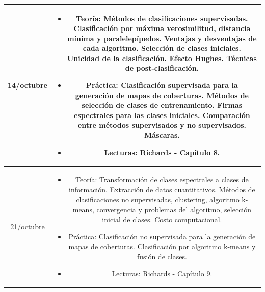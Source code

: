 \documentclass[11pt]{article}
\begin{document}
\begin{longtable}[h!]{| c | c | }
\hline
14/octubre & \begin{minipage}{.65\textwidth}
\begin{itemize} 
    \vspace{1mm}
	\item Teoría: Métodos de clasificaciones supervisadas. Clasificación por máxima verosimilitud, distancia mínima y paralelepípedos. Ventajas y desventajas de cada algoritmo. Selección de clases iniciales. Unicidad de la clasificación. Efecto Hughes. Técnicas de post-clasificación.
	\item Práctica: Clasificación supervisada para la generación de mapas de coberturas. Métodos de selección de clases de entrenamiento. Firmas espectrales para las clases iniciales. Comparación entre métodos supervisados y no supervisados. Máscaras.
	\item Lecturas: Richards - Capítulo 8.
    \vspace{1mm}
\end{itemize}
\end{minipage} \\

\hline
21/octubre & \begin{minipage}{.65\textwidth}
\begin{itemize}
    \vspace{1mm}
	\item Teoría: Transformación de clases espectrales a clases de información. Extracción de datos cuantitativos. Métodos de clasificaciones no supervisadas, clustering, algoritmo k-means, convergencia y problemas del algoritmo, selección inicial de clases. Costo computacional.
  \item Práctica: Clasificación no supervisada para la generación de mapas de coberturas. Clasificación por algoritmo k-means y fusión de clases.
	\item Lecturas: Richards - Capítulo 9.
    \vspace{1mm}
\end{itemize}
\end{minipage} \\


\end{longtable}
\end{document}
